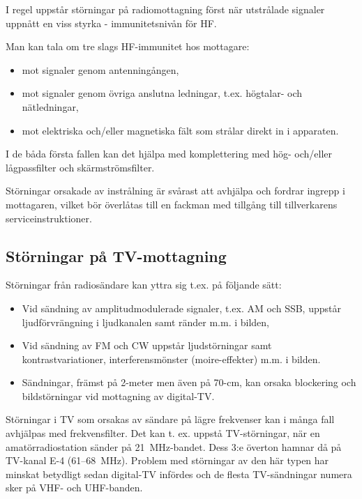 I regel uppstår störningar på radiomottagning först när utstrålade signaler
uppnått en viss styrka - immunitetsnivån för HF.

Man kan tala om tre slags HF-immunitet hos mottagare:
\begin{itemize}
\item mot signaler genom antenningången,
\item mot signaler genom övriga anslutna ledningar, t.ex. högtalar-
  och nätledningar,
\item mot elektriska och/eller magnetiska fält som strålar direkt in i
  apparaten.
\end{itemize}

I de båda första fallen kan det hjälpa med komplettering med hög- och/eller
lågpassfilter och skärmströmsfilter.

Störningar orsakade av instrålning är svårast att avhjälpa och fordrar ingrepp i
mottagaren, vilket bör överlåtas till en fackman med tillgång till
tillverkarens serviceinstruktioner.

\subsection{Störningar på TV-mottagning}


Störningar från radiosändare kan yttra sig t.ex. på följande sätt:
\begin{itemize}
\item Vid sändning av amplitudmodulerade signaler, t.ex. AM och SSB,
  uppstår ljudförvrängning i ljudkanalen samt ränder m.m. i bilden,
\item Vid sändning av FM och CW uppstår ljudstörningar samt
  kontrastvariationer, interferensmönster (moire-effekter) m.m. i
  bilden.
\item Sändningar, främst på 2-meter men även på 70-cm, kan orsaka blockering och
bildstörningar vid mottagning av digital-TV. 
\end{itemize}

Störningar i TV som orsakas av sändare på lägre frekvenser kan i många fall
avhjälpas med frekvensfilter. Det kan t. ex. uppstå TV-störningar, när en amatörradiostation sänder på 21~MHz-bandet. Dess 3:e överton hamnar då på
TV-kanal E-4 (61--68~MHz). Problem med störningar av den här typen har minskat
betydligt sedan digital-TV infördes och de flesta TV-sändningar numera sker på
VHF- och UHF-banden.

